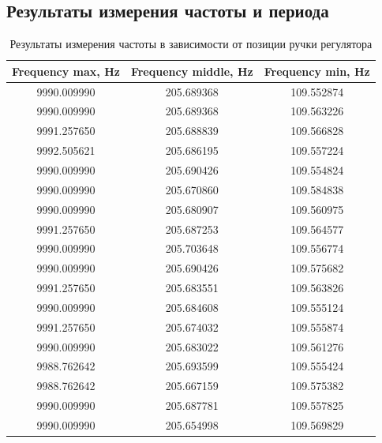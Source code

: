 \documentclass[a4paper,14pt]{article}
\begin{document}
\subsection{Результаты измерения частоты и периода}

\begin{longtable}[c]{|c|c|c|}
	\caption{Результаты измерения частоты в зависимости от позиции ручки регулятора}
	\label{tab:dfm_freq}\\
	\hline
	Frequency max, Hz & Frequency middle, Hz & Frequency min, Hz \\ \hline
	\endfirsthead
	\endhead
	9990.009990       & 205.689368           & 109.552874        \\ \hline
	9990.009990       & 205.689368           & 109.563226        \\ \hline
	9991.257650       & 205.688839           & 109.566828        \\ \hline
	9992.505621       & 205.686195           & 109.557224        \\ \hline
	9990.009990       & 205.690426           & 109.554824        \\ \hline
	9990.009990       & 205.670860           & 109.584838        \\ \hline
	9990.009990       & 205.680907           & 109.560975        \\ \hline
	9991.257650       & 205.687253           & 109.564577        \\ \hline
	9990.009990       & 205.703648           & 109.556774        \\ \hline
	9990.009990       & 205.690426           & 109.575682        \\ \hline
	9991.257650       & 205.683551           & 109.563826        \\ \hline
	9990.009990       & 205.684608           & 109.555124        \\ \hline
	9991.257650       & 205.674032           & 109.555874        \\ \hline
	9990.009990       & 205.683022           & 109.561276        \\ \hline
	9988.762642       & 205.693599           & 109.555424        \\ \hline
	9988.762642       & 205.667159           & 109.575382        \\ \hline
	9990.009990       & 205.687781           & 109.557825        \\ \hline
	9990.009990       & 205.654998           & 109.569829        \\ \hline

\end{longtable}
\end{document}
